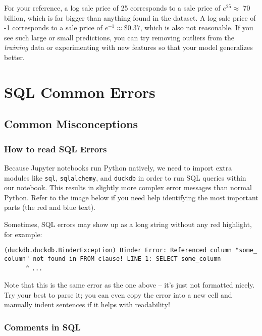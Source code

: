 \documentclass[
  letterpaper,
  DIV=11,
  numbers=noendperiod]{scrreprt}
\begin{document}
For your reference, a log sale price of 25 corresponds to a sale price
of \(e^{25} \approx\) 70 billion, which is far bigger than anything
found in the dataset. A log sale price of -1 corresponds to a sale price
of \(e^{-1} \approx \$0.37\), which is also not reasonable. If you see
such large or small predictions, you can try removing outliers from the
\emph{training} data or experimenting with new features so that your
model generalizes better.


\chapter{SQL Common Errors}\label{sql-common-errors}

\section{Common Misconceptions}\label{common-misconceptions}

\subsection{How to read SQL Errors}\label{how-to-read-sql-errors}

Because Jupyter notebooks run Python natively, we need to import extra
modules like \texttt{sql}, \texttt{sqlalchemy}, and \texttt{duckdb} in
order to run SQL queries within our notebook. This results in slightly
more complex error messages than normal Python. Refer to the image below
if you need help identifying the most important parts (the red and blue
text).

Sometimes, SQL errors may show up as a long string without any red
highlight, for example:

\texttt{(duckdb.duckdb.BinderException)\ Binder\ Error:\ Referenced\ column\ "some\_column"\ not\ found\ in\ FROM\ clause!\ LINE\ 1:\ SELECT\ some\_column\ \ \ \ \ \ \ \ \ \ \ \ \ \ \ \ \^{}}
\texttt{...}

Note that this is the same error as the one above -- it's just not
formatted nicely. Try your best to parse it; you can even copy the error
into a new cell and manually indent sentences if it helps with
readability!

\subsection{Comments in SQL}\label{comments-in-sql}
\end{document}
